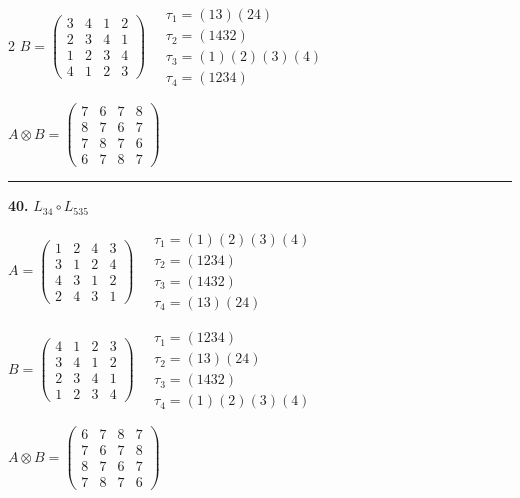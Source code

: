 \begin{multicols}{2}
$B = \begin{pmatrix} 3 & 4 & 1 & 2 \\ 2 & 3 & 4 & 1 \\ 1 & 2 & 3 & 4 \\ 4 & 1 & 2 & 3 \end{pmatrix} \quad \begin{matrix} \tau_{1}=(1 3)(2 4) \\ \tau_{2}=(1 4 3 2) \\ \tau_{3}=(1)(2)(3)(4) \\ \tau_{4}=(1 2 3 4) \end{matrix}$

$A \otimes B = \begin{pmatrix} 7 & 6 & 7 & 8 \\ 8 & 7 & 6 & 7 \\ 7 & 8 & 7 & 6 \\ 6 & 7 & 8 & 7 \end{pmatrix}$

\vspace{0.3em}
\hrule
\vspace{0.3em}

\noindent\textbf{40.} $L_{34} \circ L_{535}$

$A = \begin{pmatrix} 1 & 2 & 4 & 3 \\ 3 & 1 & 2 & 4 \\ 4 & 3 & 1 & 2 \\ 2 & 4 & 3 & 1 \end{pmatrix} \quad \begin{matrix} \tau_{1}=(1)(2)(3)(4) \\ \tau_{2}=(1 2 3 4) \\ \tau_{3}=(1 4 3 2) \\ \tau_{4}=(1 3)(2 4) \end{matrix}$

$B = \begin{pmatrix} 4 & 1 & 2 & 3 \\ 3 & 4 & 1 & 2 \\ 2 & 3 & 4 & 1 \\ 1 & 2 & 3 & 4 \end{pmatrix} \quad \begin{matrix} \tau_{1}=(1 2 3 4) \\ \tau_{2}=(1 3)(2 4) \\ \tau_{3}=(1 4 3 2) \\ \tau_{4}=(1)(2)(3)(4) \end{matrix}$

$A \otimes B = \begin{pmatrix} 6 & 7 & 8 & 7 \\ 7 & 6 & 7 & 8 \\ 8 & 7 & 6 & 7 \\ 7 & 8 & 7 & 6 \end{pmatrix}$


\end{multicols}
